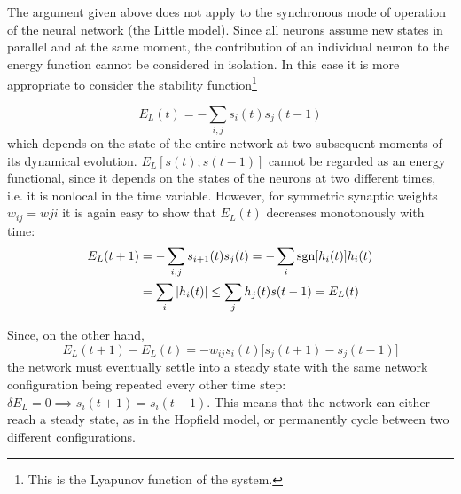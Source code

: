 The argument given above does not apply to the synchronous mode of operation of the neural network (the Little model). Since all neurons assume new states in parallel and at the same moment, the contribution of an individual neuron to the energy function cannot be considered in isolation. In
this case it is more appropriate to consider the stability function\footnote{This is the Lyapunov function of the system.}

\begin{equation}
    E_{L}(t)=-\sum_{i,j}s_{i}(t)s_{j}(t-1)
\end{equation}
which depends on the state of the entire network at two subsequent moments of its dynamical evolution. $E_{L}[s(t);s(t-1)]$ cannot be regarded as an energy functional, since it depends on the states of the neurons at two different times, i.e. it is nonlocal in the time variable. However, for symmetric synaptic weights $w_{ij} = w{ji}$ it is again easy to show that $E_{L}(t)$ decreases monotonously
with time:
\begin{equation}\begin{split}
E_{L}(t+1)&=-\sum_{i,j}s_{i+1}(t)s_{j}(t)=-\sum_{i}\operatorname{sgn}[h_{i}(t)]h_{i}(t)\\
    &=\sum_{i}|h_{i}(t)|\leq \sum_{j}h_{j}(t)s(t-1)=E_{L}(t)
    \end{split}
\end{equation}

Since, on the other hand,
\begin{equation}
    E_{L}(t+1)-E_{L}(t)=-w_{ij}s_{i}(t)\Big[s_{j}(t+1)-s_{j}(t-1)\Big]
\end{equation}
the network must eventually settle into a steady state with the same network configuration being repeated every other time step: $\delta E_{L}=0 \implies s_i (t + 1) = s_i (t - 1)$. This means that the network can either reach a steady state, as in the Hopfield model, or permanently cycle between two different configurations.

